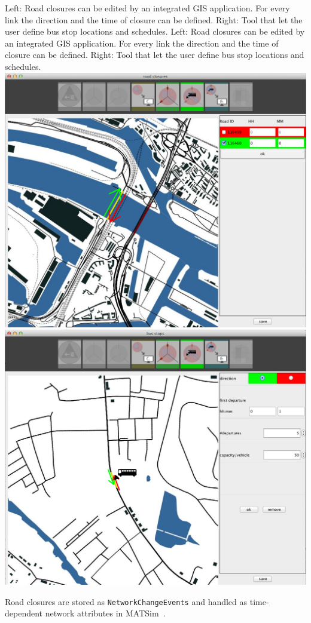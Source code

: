 \createfigure%
{Left: Road closures can be edited by an integrated GIS application. For every link the direction and the time of closure can be defined. Right: Tool that let the user define bus stop locations and schedules.}%
{Left: Road closures can be edited by an integrated GIS application. For every link the direction and the time of closure can be defined. Right: Tool that let the user define bus stop locations and schedules.}%
{\label{chap:evac:fig:area_pop}}%
{%
  \createsubfigure%
  {}%
{\includegraphics[width=.475\linewidth]{extending/figures/Evacuation/rd_closure_detail}}
  {}%
  {}%
  \createsubfigure%
  {}%
{\includegraphics[width=.475\linewidth]{extending/figures/Evacuation/bus_stops}}
  {}%
  {}%
}%
  {}%

Road closures are stored as \verb+NetworkChangeEvents+ and handled as time-dependent network attributes in MATSim~\cite{LaemmelEtAl_TransResC_2010}.

